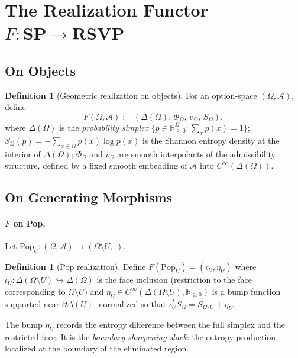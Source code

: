 \documentclass[12pt,a4paper]{article}
\theoremstyle{definition}
\newtheorem{definition}[theorem]{Definition}
\theoremstyle{remark}
\newcommand{\Rnn}{\mathbb{R}_{\ge 0}}
\newcommand{\SP}{\mathbf{SP}}
\newcommand{\RSVP}{\mathbf{RSVP}}
\newcommand{\Pop}{\ensuremath{\mathrm{Pop}}}
\newcommand{\PhiF}{\Phi}
\newcommand{\vF}{v}
\newcommand{\SF}{S}
\begin{document}
\section{The Realization Functor \texorpdfstring{$F:\SP\to\RSVP$}{F}}
\label{sec:functor}

\subsection{On Objects}

\begin{definition}[Geometric realization on objects]
\label{def:F-objects}
For an option-space $(\Omega,\mathcal{A})$, define
\[
  F(\Omega,\mathcal{A}) := (\Delta(\Omega),\,\PhiF_\Omega,\,\vF_\Omega,\,\SF_\Omega),
\]
where $\Delta(\Omega)$ is the \emph{probability simplex} $\{p\in\Rnn^\Omega:\sum_x p(x)=1\}$;
$\SF_\Omega(p)=-\sum_{x\in\Omega}p(x)\log p(x)$ is the Shannon entropy density at
the interior of $\Delta(\Omega)$; $\PhiF_\Omega$ and $\vF_\Omega$ are smooth
interpolants of the admissibility structure, defined by a fixed smooth embedding
of $\mathcal{A}$ into $C^\infty(\Delta(\Omega))$.
\end{definition}

\subsection{On Generating Morphisms}

\paragraph{$F$ on Pop.}
Let $\Pop_U:(\Omega,\mathcal{A})\to(\Omega\setminus U,\cdot)$.

\begin{definition}[Pop realization]
\label{def:F-pop}
Define $F(\Pop_U)=(\iota_U,\eta_U)$ where $\iota_U:\Delta(\Omega\setminus U)
\hookrightarrow\Delta(\Omega)$ is the face inclusion (restriction to the face
corresponding to $\Omega\setminus U$) and $\eta_U\in C^\infty(\Delta(\Omega\setminus
U),\Rnn)$ is a bump function supported near $\partial\Delta(U)$, normalized so that
$\iota_U^*\SF_\Omega=\SF_{\Omega\setminus U}+\eta_U$.
\end{definition}

The bump $\eta_U$ records the entropy difference between the full simplex and the
restricted face. It is the \emph{boundary-sharpening slack}: the entropy production
localized at the boundary of the eliminated region.
\end{document}
